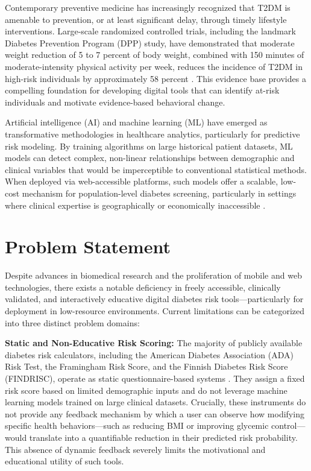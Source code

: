 \documentclass[12pt,a4paper]{report}
\begin{document}
Contemporary preventive medicine has increasingly recognized that T2DM is amenable to prevention, or at least significant delay, through timely lifestyle interventions. Large-scale randomized controlled trials, including the landmark Diabetes Prevention Program (DPP) study, have demonstrated that moderate weight reduction of 5 to 7 percent of body weight, combined with 150 minutes of moderate-intensity physical activity per week, reduces the incidence of T2DM in high-risk individuals by approximately 58 percent \cite{dpp_study}. This evidence base provides a compelling foundation for developing digital tools that can identify at-risk individuals and motivate evidence-based behavioral change.

Artificial intelligence (AI) and machine learning (ML) have emerged as transformative methodologies in healthcare analytics, particularly for predictive risk modeling. By training algorithms on large historical patient datasets, ML models can detect complex, non-linear relationships between demographic and clinical variables that would be imperceptible to conventional statistical methods. When deployed via web-accessible platforms, such models offer a scalable, low-cost mechanism for population-level diabetes screening, particularly in settings where clinical expertise is geographically or economically inaccessible \cite{kaviani_classifiers}.

\section{Problem Statement}
Despite advances in biomedical research and the proliferation of mobile and web technologies, there exists a notable deficiency in freely accessible, clinically validated, and interactively educative digital diabetes risk tools---particularly for deployment in low-resource environments. Current limitations can be categorized into three distinct problem domains:

\textbf{Static and Non-Educative Risk Scoring:} The majority of publicly available diabetes risk calculators, including the American Diabetes Association (ADA) Risk Test, the Framingham Risk Score, and the Finnish Diabetes Risk Score (FINDRISC), operate as static questionnaire-based systems \cite{ada_standards_2023}. They assign a fixed risk score based on limited demographic inputs and do not leverage machine learning models trained on large clinical datasets. Crucially, these instruments do not provide any feedback mechanism by which a user can observe how modifying specific health behaviors---such as reducing BMI or improving glycemic control---would translate into a quantifiable reduction in their predicted risk probability. This absence of dynamic feedback severely limits the motivational and educational utility of such tools.
\end{document}

